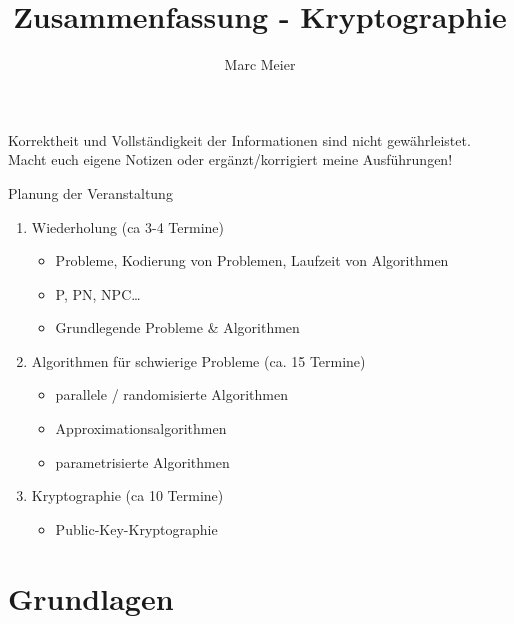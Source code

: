 \documentclass{article} %
\title{Zusammenfassung - Kryptographie}
\author{
	Marc Meier
}
\begin{document}
\maketitle
\begin{framed}Korrektheit und Vollständigkeit der Informationen sind nicht gewährleistet.
Macht euch eigene Notizen oder ergänzt/korrigiert meine Ausführungen!
\end{framed}
\setcounter{tocdepth}{1}
\tableofcontents

\begin{framed}
Planung der Veranstaltung %
\begin{enumerate}
	\item Wiederholung (ca 3-4 Termine)
	\begin{itemize}
		\item Probleme, Kodierung von Problemen, Laufzeit von Algorithmen
		\item P, PN, NPC…
		\item Grundlegende Probleme \& Algorithmen
	\end{itemize}
	\item Algorithmen für schwierige Probleme (ca. 15 Termine)
	\begin{itemize}
		\item parallele / randomisierte Algorithmen
		\item Approximationsalgorithmen
		\item parametrisierte Algorithmen
	\end{itemize}
	\item Kryptographie (ca 10 Termine)
	\begin{itemize}
		\item Public-Key-Kryptographie
	\end{itemize}
\end{enumerate}
\end{framed}
\section{Grundlagen}
	
\end{document}
